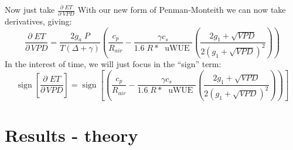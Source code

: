 \documentclass[aspectratio=169]{beamer}
\DeclareMathOperator{\sign}{sign}
\begin{document}
\begin{frame}{Now just take $\frac{\partial \; ET}{\partial \; VPD}$}
  With our new form of Penman-Monteith we can now take derivatives, giving:
  \[\frac{\partial \;  ET}{\partial \, VPD} = \frac{2 g_a \; P}{T(\Delta + \gamma)}   \left(\frac{ c_p}{R_{air}} - \frac{\gamma c_s }{1.6 \; R*\; \text{ uWUE }} \left( \frac{2 g_1 + \sqrt{VPD}}{2 (g_1 + \sqrt{VPD})^2}\right) \right)\]
  In the interest of time, we will just focus in the ``sign'' term:
  \[\sign \left[\frac{\partial \;  ET}{\partial \, VPD}\right] = \sign \left[  \left(\frac{ c_p}{R_{air}} - \frac{\gamma c_s }{1.6 \; R*\; \text{ uWUE }} \left( \frac{2 g_1 + \sqrt{VPD}}{2 (g_1 + \sqrt{VPD})^2}\right) \right) \right] \]

\end{frame}

\section{Results - theory}
\end{document}
